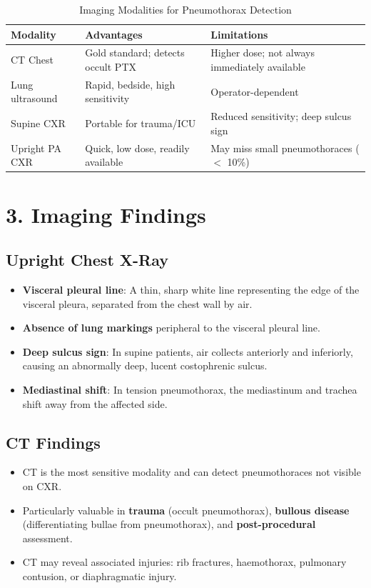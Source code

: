 \begin{table}[h]
\centering
\begin{tabular}{@{}p{}p{}p{}@{}}
\hline
\textbf{Modality} & \textbf{Advantages} & \textbf{Limitations} \\
\hline
CT Chest & Gold standard; detects occult PTX & Higher dose; not always immediately available \\
Lung ultrasound & Rapid, bedside, high sensitivity & Operator-dependent \\
Supine CXR & Portable for trauma/ICU & Reduced sensitivity; deep sulcus sign \\
Upright PA CXR & Quick, low dose, readily available & May miss small pneumothoraces ($<$ 10\%) \\
\hline
\end{tabular}
\caption{Imaging Modalities for Pneumothorax Detection}
\end{table}


\section{3. Imaging Findings}

\subsection{Upright Chest X-Ray}
\begin{itemize}
  \item \textbf{Visceral pleural line}: A thin, sharp white line representing the edge of the visceral pleura, separated from the chest wall by air.
  \item \textbf{Absence of lung markings} peripheral to the visceral pleural line.
  \item \textbf{Deep sulcus sign}: In supine patients, air collects anteriorly and inferiorly, causing an abnormally deep, lucent costophrenic sulcus.
  \item \textbf{Mediastinal shift}: In tension pneumothorax, the mediastinum and trachea shift away from the affected side.
\end{itemize}

\subsection{CT Findings}
\begin{itemize}
  \item CT is the most sensitive modality and can detect pneumothoraces not visible on CXR.
  \item Particularly valuable in \textbf{trauma} (occult pneumothorax), \textbf{bullous disease} (differentiating bullae from pneumothorax), and \textbf{post-procedural} assessment.
  \item CT may reveal associated injuries: rib fractures, haemothorax, pulmonary contusion, or diaphragmatic injury.
\end{itemize}

